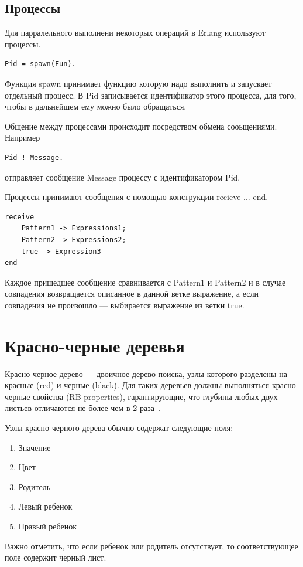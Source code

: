 		\subsection{Процессы}
			Для парралельного выполнени некоторых операций в Erlang используют процессы.
			\begin{lstlisting}
Pid = spawn(Fun).
			\end{lstlisting}
			Функция spawn принимает функцию которую надо выполнить и запускает отдельный процесс. В Pid записывается идентификатор
			этого процесса, для того, чтобы в дальнейшем ему можно было обращаться.
			
			Общение между процессами происходит посредством обмена сооьщениями. Например
			\begin{lstlisting}
Pid ! Message.
			\end{lstlisting}
			отправляет сообщение Message процессу с идентификатором Pid.

			Процессы принимают сообщения с помощью конструкции recieve ... end. 
			\begin{lstlisting}
receive
	Pattern1 -> Expressions1;
	Pattern2 -> Expressions2;
	true -> Expression3
end
			\end{lstlisting}
			Каждое пришедшее сообщение сравнивается с Pattern1 и Pattern2 и в случае совпадения возвращается описанное в данной 
			ветке выражение, а если совпадения не произошло --- выбирается выражение из ветки true. 
	

	\section{Красно-черные деревья}
		Красно-черное дерево --- двоичное дерево поиска, узлы которого 
		разделены на красные (red) и черные (black). Для таких деревьев
		должны выполняться красно-черные свойства (RB properties), 
		гарантирующие, что глубины любых двух листьев отличаются не более
		чем в 2 раза~\cite{kormen}.

		Узлы красно-черного дерева обычно содержат следующие поля:
		\begin{enumerate}
			\item Значение
			\item Цвет
			\item Родитель
			\item Левый ребенок
			\item Правый ребенок
		\end{enumerate}	

		Важно отметить, что если ребенок или родитель отсутствует, то
		соответствующее поле содержит черный лист.
		
